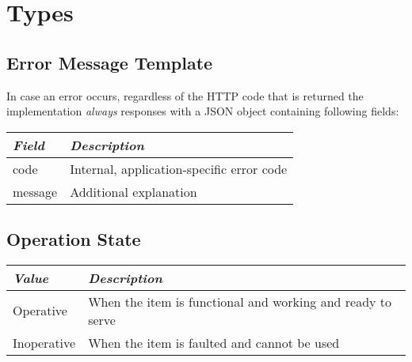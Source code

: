 \section{Types}

%

\subsection{Error Message Template}
\label{types:error-msg-template}

In case an error occurs, regardless of the HTTP code that is returned the implementation \textit{always} responses with a JSON object containing following fields: 

\begin{tabularx}{\linewidth}{ | l | X | }
  \hline
  \textit{Field} & \textit{Description} \\
  \hline \hline
  code 		& Internal, application-specific error code \\
  message 	& Additional explanation \\
  \hline
\end{tabularx}


\subsection{Operation State}
\label{types:OperationState}

\begin{tabularx}{\linewidth}{ | l | X | }
  \hline
  \textit{Value} & \textit{Description} \\
  \hline \hline
  Operative 		& When the item is functional and working and ready to serve \\
  Inoperative 	& When the item is faulted and cannot be used \\
  \hline
\end{tabularx}

%

